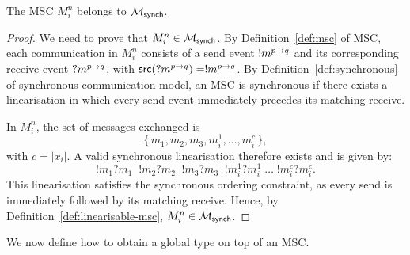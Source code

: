 \bigskip

\begin{lemma}\label{lemma:minsynch}
The MSC $M_i^n$ belongs to $\mscsetofmodel{\synchmodel}$.
\end{lemma}

\begin{proof}
We need to prove that $M_i^n\in\mscsetofmodel{\synchmodel}$.
By Definition~\ref{def:msc} of MSC, each communication in $M_i^n$
consists of a send event $\send{p}{q}{m}$ and its corresponding
receive event $\recv{p}{q}{m}$, with $\source(\recv{p}{q}{m}) =
\send{p}{q}{m}$.  
By Definition~\ref{def:synchronous} of synchronous communication 
model, an MSC is synchronous
if there exists a linearisation in which every send event
immediately precedes its matching receive.

In $M_i^n$, the set of messages exchanged is
\[
\{\, m_1, m_2, m_3, m_i^1, \ldots, m_i^c \,\},
\]
with $c = |x_i|$.  
A valid synchronous linearisation therefore exists and is given by:
\[
!m_1 ?m_1\;\; !m_2 ?m_2\;\; !m_3 ?m_3\;\;
!m_i^1 ?m_i^1 \;\ldots\; !m_i^c ?m_i^c.
\]
This linearisation satisfies the synchronous ordering constraint,
as every send is immediately followed by its matching receive.
Hence, by Definition~\ref{def:linearisable-msc},  
$M_i^n \in \mscsetofmodel{\synchmodel}$.
\end{proof}

We now define how to obtain a global type on top of an MSC.

\bigskip

